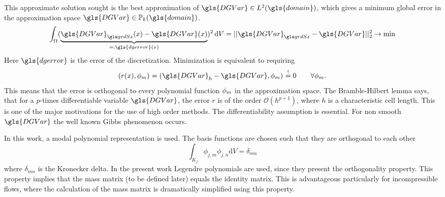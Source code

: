 This approximate solution sought  is the best approximation of $\gls{DGVar} \in L^2(\gls{domain})$, which gives a minimum global error in the approximation space $\gls{DGVar} \in \mathbb{P}_k(\gls{domain} )$. 
\begin{align}
	\int_{\domain} (\underbrace{ \nuM{\gls{DGVar}}(x)-\gls{DGVar}(x) }_{=: \gls{dgerror}(x)})^2 \dV
	= ||\nuM{\gls{DGVar}} - \gls{DGVar}||_2^2 \rightarrow \text{min}
\end{align}
Here $\gls{dgerror}$ is the error of the discretization. Minimization is equivalent to requiring
\begin{equation}
	\label{eq:L2projection}
	\scp{r(x)}{\basis{}_m} = \scp{\gls{DGVar}_h-\gls{DGVar}}{\basis{}_m} \stackrel{!}{=} 0 \qquad \forall\basis{}_m.
\end{equation}
This means that the error is orthogonal to every polynomial function $ \phi{}_m$ in the approximation space. The Bramble-Hilbert lemma \parencite{brambleEstimationLinearFunctionals1970} says, that for a $p$-times differentiable variable $\gls{DGVar}$, the error $r$ is of the order $\mathcal{O}(h^{p+1})$, where $h$ is a characteristic cell length. This is one of the major motivations for the use of high order methods. The differentiability assumption is essential. For non smooth $\gls{DGVar}$ the well known Gibbs phenomenon occurs.

In this work, a modal polynomial representation is used. The basis functions are chosen such that they are orthogonal to each other 
\begin{equation}
	\int_{K_j} \phi_{j,m}\phi_{j,n} \text{d}V= \delta_{mn}
\end{equation}
where $\delta_{mn}$ is the Kronecker delta. In the present work Legendre polynomials are used, since they present the orthogonality property. This property implies that the mass matrix (to be defined later) equals the identity matrix. This is advantageous particularly for incompressible flows, where the calculation of the mass matrix is dramatically simplified using this property.


